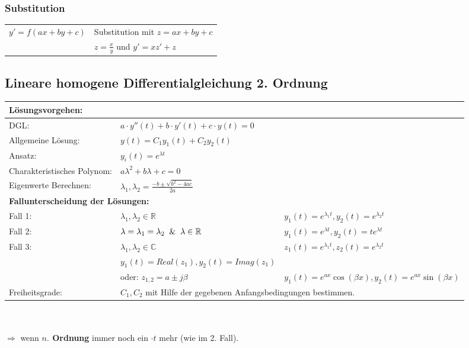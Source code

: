 \subsubsection{Substitution}
\begin{tabular}{p{4cm}p{6cm}}
	$y' = f(ax + by + c)$ & Substitution mit $z = ax + by + c$\\
	& $z = \frac{x}{y}$ und $y' = xz' + z$ \\
\end{tabular}

\subsection{Lineare homogene Differentialgleichung 2. Ordnung}
\begin{tabular}{p{}p{}p{}}
	\multicolumn{3}{l}{\textbf{Lösungsvorgehen:}}\\
	\hline
	DGL:                       		
		& $a \cdot y''(t) + b \cdot y'(t) + c \cdot y(t) = 0$
		&\\
	Allgemeine Lösung:
		& $y(t) = C_1y_1(t) + C_2y_2(t)$
		&\\
	Ansatz:                    		
		& $y_i(t) = e^{\lambda t}$
		&\\
	Charakteristisches Polynom:    	
		& $a\lambda^2 + b\lambda +c =0$
		&\\
	Eigenwerte Berechnen:	 		
		& $\lambda_1,\lambda_2 = \frac{-b \pm \sqrt{b^2 - 4ac}}{2a}$
		&\\
	\multicolumn{3}{l}{\textbf{Fallunterscheidung der Lösungen:}}\\
	\hline
	Fall 1:                    		
		& $\lambda_1,\lambda_2 \in \mathbb{R}$
		& $y_1(t) = e^{\lambda_1 t}, y_2(t) = e^{\lambda_2 t}$\\
	Fall 2:                    		
		& $\lambda = \lambda_1 = \lambda_2 \And \lambda \in \mathbb{R}$
		& $y_1(t) = e^{\lambda t}, y_2(t) = te^{\lambda t}$\\
	Fall 3:                    		
		& $\lambda_1,\lambda_2 \in \mathbb{C}$
		& $z_1(t) = e^{\lambda_1 t}, z_2(t) = e^{\lambda_2 t}$\\
	    & $y_1(t) = Real(z_1), y_2(t) = Imag(z_1)$\\
	    & oder: $z_{1,2} = a \pm j\beta$
	    & $y_1(t) = e^{ax}\cos(\beta x), y_2(t) = e^{ax} \sin(\beta x)$\\
	Freiheitsgrade:            		
		& \multicolumn{2}{l}{$C_1,C_2$ mit Hilfe der gegebenen Anfangsbedingungen bestimmen.}\\
	\hline
\end{tabular} \\ \\
$\Rightarrow$ wenn \textbf{$n.$ Ordnung} immer noch ein $\cdot t$ mehr (wie im 2. Fall).\\ 

